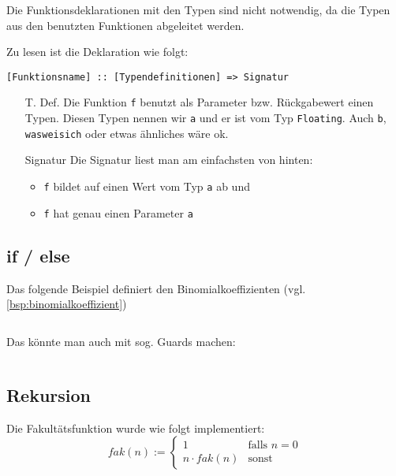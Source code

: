 \inputminted[numbersep=5pt, tabsize=4]{haskell}{scripts/haskell/einfaches-beispiel-klammern.hs}

Die Funktionsdeklarationen mit den Typen sind nicht notwendig, da 
die Typen aus den benutzten Funktionen abgeleitet werden.

Zu lesen ist die Deklaration wie folgt:

\begin{center}
\texttt{[Funktionsname] :: \texttt{[Typendefinitionen]} => \texttt{Signatur}}
\end{center}

\begin{itemize}
    \item[T. Def.] Die Funktion \texttt{f} benutzt als Parameter bzw. Rückgabewert
          einen Typen. Diesen Typen nennen wir \texttt{a} und er ist
          vom Typ \texttt{Floating}. Auch \texttt{b}, \texttt{wasweisich}
          oder etwas ähnliches wäre ok.
    \item[Signatur] Die Signatur liest man am einfachsten von hinten:
        \begin{itemize}
            \item \texttt{f} bildet auf einen Wert vom Typ \texttt{a} ab und
            \item \texttt{f} hat genau einen Parameter \texttt{a}
        \end{itemize}
\end{itemize}


\subsection{if / else}
Das folgende Beispiel definiert den Binomialkoeffizienten (vgl. \cref{bsp:binomialkoeffizient})

\inputminted[numbersep=5pt, tabsize=4]{haskell}{scripts/haskell/binomialkoeffizient.hs}

Das könnte man auch mit sog. Guards machen:

\inputminted[numbersep=5pt, tabsize=4]{haskell}{scripts/haskell/binomialkoeffizient-guard.hs}

\subsection{Rekursion}
Die Fakultätsfunktion wurde wie folgt implementiert:
\[fak(n) := \begin{cases}
        1              &\text{falls } n=0\\
        n \cdot fak(n) &\text{sonst}
    \end{cases}\]
\inputminted[numbersep=5pt, tabsize=4]{haskell}{scripts/haskell/fakultaet.hs}

